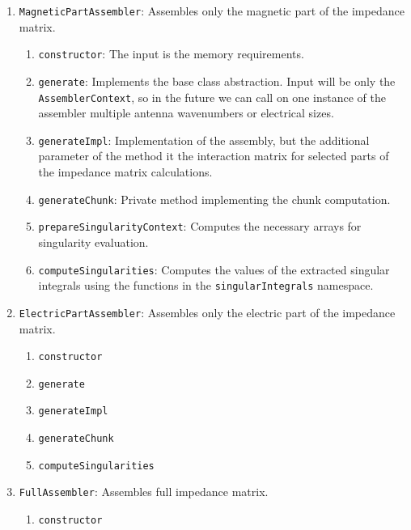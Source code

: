\documentclass[9pt]{article}
\begin{document}
\begin{enumerate}[label=\Roman*.]
\begin{enumerate}[label=\roman*.]
            \item \texttt{basisFunctions}: Returns handle to the basisFunctions.
            \item \texttt{constants}
        \end{enumerate}
        \item \texttt{MagneticPartAssembler}: Assembles only the magnetic part of the impedance matrix.
        \begin{enumerate}[label=\roman*.]
            \item \texttt{constructor}: The input is the memory requirements.
            \item \texttt{generate}: Implements the base class abstraction. Input will be only the \texttt{AssemblerContext}, so in the future we can call on one instance of the assembler multiple antenna wavenumbers or electrical sizes.
            \item \texttt{generateImpl}: Implementation of the assembly, but the additional parameter of the method it the interaction matrix for selected parts of the impedance matrix calculations.
            \item \texttt{generateChunk}: Private method implementing the chunk computation.
            \item \texttt{prepareSingularityContext}: Computes the necessary arrays for singularity evaluation.
            \item \texttt{computeSingularities}: Computes the values of the extracted singular integrals using the functions in the \texttt{singularIntegrals} namespace.
        \end{enumerate}
        \item \texttt{ElectricPartAssembler}: Assembles only the electric part of the impedance matrix.
        \begin{enumerate}[label=\roman*.]
            \item \texttt{constructor}
            \item \texttt{generate}
            \item \texttt{generateImpl}
            \item \texttt{generateChunk}
            \item \texttt{computeSingularities}
        \end{enumerate}
        \item \texttt{FullAssembler}: Assembles full impedance matrix.
        \begin{enumerate}[label=\roman*.]
            \item \texttt{constructor}

\end{enumerate}
\end{enumerate}
\end{document}
